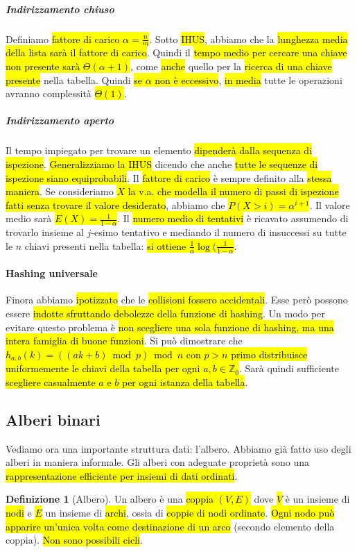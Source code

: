 \documentclass[a4paper,11pt,oneside]{article}
\theoremstyle{plain}
\theoremstyle{definition}
\newtheorem{defn}{Definizione}[section]
\theoremstyle{remark}
\begin{document}
\subparagraph{Indirizzamento chiuso} Definiamo \hl{fattore di carico $\alpha =
\frac{n}{m}$}. Sotto \hl{IHUS}, abbiamo che la \hl{lunghezza media della lista
sarà il fattore di carico}. Quindi il \hl{tempo medio per cercare una chiave non
presente sarà $\Theta(\alpha + 1)$}, come \hl{anche} quello per la \hl{ricerca
di una chiave presente} nella tabella. Quindi \hl{se $\alpha$ non è eccessivo},
\hl{in media} tutte le operazioni avranno complessità \hl{$\Theta(1)$}.

\subparagraph{Indirizzamento aperto} Il tempo impiegato per trovare un elemento
\hl{dipenderà dalla sequenza di ispezione}. \hl{Generalizziamo la IHUS} dicendo
che anche \hl{tutte le sequenze di ispezione siano equiprobabili}. Il
\hl{fattore di carico} è sempre definito alla \hl{stessa maniera}. Se
consideriamo \hl{$X$ la v.a. che modella il numero di passi di ispezione fatti
senza trovare il valore desiderato}, abbiamo che \hl{$P(X > i) = \alpha^{i+1}$}.
Il valore medio sarà \hl{$E(X) = \frac{1}{1-\alpha}$}. Il \hl{numero medio di
tentativi} è ricavato assumendo di trovarlo insieme al $j$-esimo tentativo e
mediando il numero di insuccessi su tutte le $n$ chiavi presenti nella tabella:
\hl{si ottiene $\frac{1}{\alpha}\log(\frac{1}{1-\alpha}$}.

\paragraph{Hashing universale} Finora abbiamo \hl{ipotizzato} che le
\hl{collisioni fossero accidentali}. Esse però possono essere \hl{indotte
sfruttando debolezze della funzione di hashing}. Un modo per evitare questo
problema è \hl{non scegliere una sola funzione di hashing, ma una intera
famiglia di buone funzioni}. Si può dimostrare che \hl{$h_{a,b}(k) = ((ak + b)
\bmod p) \bmod n$ con $p > n$ primo distribuisce uniformemente le chiavi della
tabella per ogni $a,b \in \mathbb{Z}_0$}. Sarà quindi sufficiente \hl{scegliere
casualmente $a$ e $b$ per ogni istanza della tabella}.

\subsection{Alberi binari}\label{sec:tree}

Vediamo ora una importante struttura dati: l'albero. Abbiamo già fatto uso degli
alberi in maniera informale. Gli alberi con adeguate proprietà sono una
\hl{rappresentazione efficiente per insiemi di dati ordinati}.

\begin{defn}[Albero]\label{def:tree}
  Un albero è una \hl{coppia $(V, E)$} dove \hl{$V$} è un insieme di \hl{nodi} e
  \hl{$E$} un insieme di \hl{archi}, ossia di \hl{coppie di nodi ordinate}.
  \hl{Ogni nodo può apparire un'unica volta come destinazione di un arco}
  (secondo elemento della coppia). \hl{Non sono possibili cicli}.
\end{defn}
\end{document}
